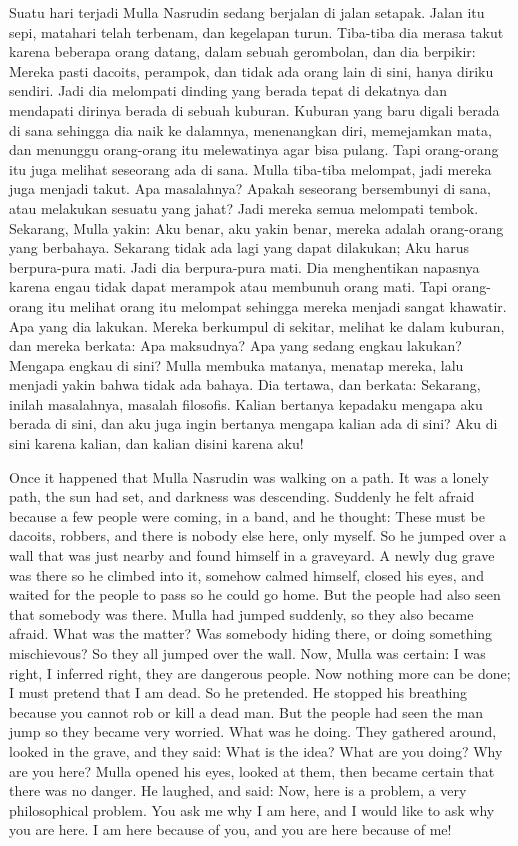 \bahasa
Suatu hari terjadi Mulla Nasrudin sedang berjalan di jalan setapak. Jalan itu sepi, matahari telah terbenam, dan kegelapan turun. Tiba-tiba dia merasa takut karena beberapa orang datang, dalam sebuah gerombolan, dan dia berpikir: Mereka pasti dacoits, perampok, dan tidak ada orang lain di sini, hanya diriku sendiri. Jadi dia melompati dinding yang berada tepat di dekatnya dan mendapati dirinya berada di sebuah kuburan. Kuburan yang baru digali berada di sana sehingga dia naik ke dalamnya, menenangkan diri, memejamkan mata, dan menunggu orang-orang itu melewatinya agar bisa pulang. Tapi orang-orang itu juga melihat seseorang ada di sana. Mulla tiba-tiba melompat, jadi mereka juga menjadi takut. Apa masalahnya? Apakah seseorang bersembunyi di sana, atau melakukan sesuatu yang jahat? Jadi mereka semua melompati tembok. Sekarang, Mulla yakin: Aku benar, aku yakin benar, mereka adalah orang-orang yang berbahaya. Sekarang tidak ada lagi yang dapat dilakukan; Aku harus berpura-pura mati. Jadi dia berpura-pura mati. Dia menghentikan napasnya karena engau tidak dapat merampok atau membunuh orang mati. Tapi orang-orang itu melihat orang itu melompat sehingga mereka menjadi sangat khawatir. Apa yang dia lakukan. Mereka berkumpul di sekitar, melihat ke dalam kuburan, dan mereka berkata: Apa maksudnya? Apa yang sedang engkau lakukan? Mengapa engkau di sini? Mulla membuka matanya, menatap mereka, lalu menjadi yakin bahwa tidak ada bahaya. Dia tertawa, dan berkata: Sekarang, inilah masalahnya, masalah filosofis. Kalian bertanya kepadaku mengapa aku berada di sini, dan aku juga ingin bertanya mengapa kalian ada di sini? Aku di sini karena kalian, dan kalian disini karena aku!

\english
Once it happened that Mulla Nasrudin was walking on a path. It was a lonely path, the sun had set, and darkness was descending. Suddenly he felt afraid because a few people were coming, in a band, and he thought: These must be dacoits, robbers, and there is nobody else here, only myself. So he jumped over a wall that was just nearby and found himself in a graveyard. A newly dug grave was there so he climbed into it, somehow calmed himself, closed his eyes, and waited for the people to pass so he could go home. But the people had also seen that somebody was there. Mulla had jumped suddenly, so they also became afraid. What was the matter? Was somebody hiding there, or doing something mischievous? So they all jumped over the wall. Now, Mulla was certain: I was right, I inferred right, they are dangerous people. Now nothing more can be done; I must pretend that I am dead. So he pretended. He stopped his breathing because you cannot rob or kill a dead man. But the people had seen the man jump so they became very worried. What was he doing. They gathered around, looked in the grave, and they said: What is the idea? What are you doing? Why are you here? Mulla opened his eyes, looked at them, then became certain that there was no danger. He laughed, and said: Now, here is a problem, a very philosophical problem. You ask me why I am here, and I would like to ask why you are here. I am here because of you, and you are here because of me!

